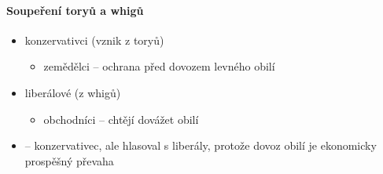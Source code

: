 \paragraph{Soupeření toryů a whigů}
\begin{itemize}
\item konzervativci (vznik z toryů)
	\begin{itemize}
	\item zemědělci -- ochrana před dovozem levného obilí
	\end{itemize}
\item liberálové (z whigů)
	\begin{itemize}
	\item obchodníci -- chtějí dovážet obilí 
	\end{itemize}
\item {} -- konzervativec, ale hlasoval s liberály, protože dovoz obilí je ekonomicky prospěšný \ra převaha
\end{itemize}



\newpage
\timeline

